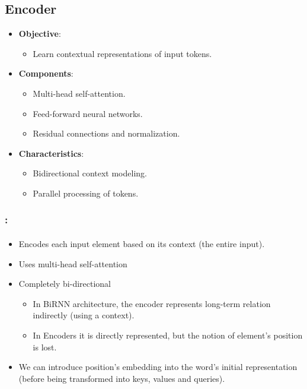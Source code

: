 \documentclass[xcolor=table]{beamer}
\begin{document}
	\subsection{Encoder}
	
	\begin{subsectionframe}
		\begin{itemize}
			
			\item \textbf{Objective}:
			\begin{itemize}
				\item Learn contextual representations of input tokens.
			\end{itemize}
			
			\item \textbf{Components}:
			\begin{itemize}
				\item Multi-head self-attention.
				\item Feed-forward neural networks.
				\item Residual connections and normalization.
			\end{itemize}
			
			\item \textbf{Characteristics}:
			\begin{itemize}
				\item Bidirectional context modeling.
				\item Parallel processing of tokens.
			\end{itemize}
			
		\end{itemize}
	\end{subsectionframe}
	
	\begin{frame}
		\frametitle{\insertshortsubtitle: \insertsection}
		\framesubtitle{\insertsubsection}
		
		\begin{itemize}
			\item Encodes each input element based on its context (the entire input).
			\item Uses multi-head self-attention
			\item Completely bi-directional
			\begin{itemize}
				\item In BiRNN architecture, the encoder represents long-term relation indirectly (using a context).
				\item In Encoders it is directly represented, but the notion of element's position is lost.
			\end{itemize} 
			\item We can introduce position's embedding into the word's initial representation (before being transformed into keys, values and queries).
		\end{itemize}
		
	\end{frame}
	
\end{document}
